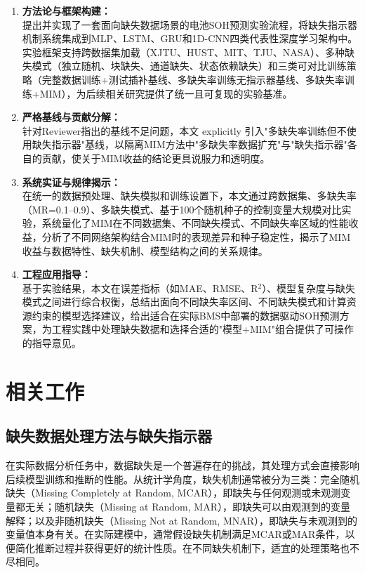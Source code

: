 \documentclass[10pt,a4paper]{ctexart}
\begin{document}
\begin{enumerate}[label=(\arabic*)]
    \item \textbf{方法论与框架构建：}\\
    提出并实现了一套面向缺失数据场景的电池SOH预测实验流程，将缺失指示器机制系统集成到MLP、LSTM、GRU和1D-CNN四类代表性深度学习架构中。实验框架支持跨数据集加载（XJTU、HUST、MIT、TJU、NASA）、多种缺失模式（独立随机、块缺失、通道缺失、状态依赖缺失）和三类可对比训练策略（完整数据训练+测试插补基线、多缺失率训练无指示器基线、多缺失率训练+MIM），为后续相关研究提供了统一且可复现的实验基准。
    
    \item \textbf{严格基线与贡献分解：}\\
    针对Reviewer指出的基线不足问题，本文 explicitly 引入"多缺失率训练但不使用缺失指示器"基线，以隔离MIM方法中"多缺失率数据扩充"与"缺失指示器"各自的贡献，使关于MIM收益的结论更具说服力和透明度。
    
    \item \textbf{系统实证与规律揭示：}\\
    在统一的数据预处理、缺失模拟和训练设置下，本文通过跨数据集、多缺失率（MR=0.1--0.9）、多缺失模式、基于100个随机种子的控制变量大规模对比实验，系统量化了MIM在不同数据集、不同缺失模式、不同缺失率区域的性能收益，分析了不同网络架构结合MIM时的表现差异和种子稳定性，揭示了MIM收益与数据特性、缺失机制、模型结构之间的关系规律。
    
    \item \textbf{工程应用指导：}\\
    基于实验结果，本文在误差指标（如MAE、RMSE、R$^2$）、模型复杂度与缺失模式之间进行综合权衡，总结出面向不同缺失率区间、不同缺失模式和计算资源约束的模型选择建议，给出适合在实际BMS中部署的数据驱动SOH预测方案，为工程实践中处理缺失数据和选择合适的"模型+MIM"组合提供了可操作的指导意见。
\end{enumerate}

\section{相关工作}\label{sec:related}

\subsection{缺失数据处理方法与缺失指示器}

在实际数据分析任务中，数据缺失是一个普遍存在的挑战，其处理方式会直接影响后续模型训练和推断的性能。从统计学角度，缺失机制通常被分为三类：完全随机缺失（Missing Completely at Random, MCAR），即缺失与任何观测或未观测变量都无关；随机缺失（Missing at Random, MAR），即缺失可以由观测到的变量解释；以及非随机缺失（Missing Not at Random, MNAR），即缺失与未观测到的变量值本身有关\cite{little2002statistical}。在实际建模中，通常假设缺失机制满足MCAR或MAR条件，以便简化推断过程并获得更好的统计性质\cite{little2002statistical}。在不同缺失机制下，适宜的处理策略也不尽相同。
\end{document}
